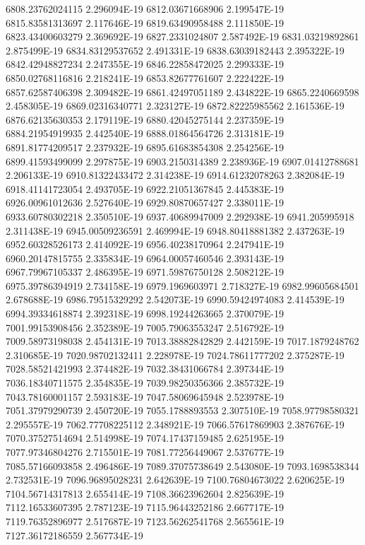 6808.23762024115  2.296094E-19
6812.03671668906  2.199547E-19
6815.83581313697  2.117646E-19
6819.63490958488  2.111850E-19
6823.43400603279  2.369692E-19
6827.2331024807  2.587492E-19
6831.03219892861  2.875499E-19
6834.83129537652  2.491331E-19
6838.63039182443  2.395322E-19
6842.42948827234  2.247355E-19
6846.22858472025  2.299333E-19
6850.02768116816  2.218241E-19
6853.82677761607  2.222422E-19
6857.62587406398  2.309482E-19
6861.42497051189  2.434822E-19
6865.2240669598  2.458305E-19
6869.02316340771  2.323127E-19
6872.82225985562  2.161536E-19
6876.62135630353  2.179119E-19
6880.42045275144  2.237359E-19
6884.21954919935  2.442540E-19
6888.01864564726  2.313181E-19
6891.81774209517  2.237932E-19
6895.61683854308  2.254256E-19
6899.41593499099  2.297875E-19
6903.2150314389  2.238936E-19
6907.01412788681  2.206133E-19
6910.81322433472  2.314238E-19
6914.61232078263  2.382084E-19
6918.41141723054  2.493705E-19
6922.21051367845  2.445383E-19
6926.00961012636  2.527640E-19
6929.80870657427  2.338011E-19
6933.60780302218  2.350510E-19
6937.40689947009  2.292938E-19
6941.205995918  2.311438E-19
6945.00509236591  2.469994E-19
6948.80418881382  2.437263E-19
6952.60328526173  2.414092E-19
6956.40238170964  2.247941E-19
6960.20147815755  2.335834E-19
6964.00057460546  2.393143E-19
6967.79967105337  2.486395E-19
6971.59876750128  2.508212E-19
6975.39786394919  2.734158E-19
6979.1969603971  2.718327E-19
6982.99605684501  2.678688E-19
6986.79515329292  2.542073E-19
6990.59424974083  2.414539E-19
6994.39334618874  2.392318E-19
6998.19244263665  2.370079E-19
7001.99153908456  2.352389E-19
7005.79063553247  2.516792E-19
7009.58973198038  2.454131E-19
7013.38882842829  2.442159E-19
7017.1879248762  2.310685E-19
7020.98702132411  2.228978E-19
7024.78611777202  2.375287E-19
7028.58521421993  2.374482E-19
7032.38431066784  2.397344E-19
7036.18340711575  2.354835E-19
7039.98250356366  2.385732E-19
7043.78160001157  2.593183E-19
7047.58069645948  2.523978E-19
7051.37979290739  2.450720E-19
7055.1788893553  2.307510E-19
7058.97798580321  2.295557E-19
7062.77708225112  2.348921E-19
7066.57617869903  2.387676E-19
7070.37527514694  2.514998E-19
7074.17437159485  2.625195E-19
7077.97346804276  2.715501E-19
7081.77256449067  2.537677E-19
7085.57166093858  2.496486E-19
7089.37075738649  2.543080E-19
7093.1698538344  2.732531E-19
7096.96895028231  2.642639E-19
7100.76804673022  2.620625E-19
7104.56714317813  2.655414E-19
7108.36623962604  2.825639E-19
7112.16533607395  2.787123E-19
7115.96443252186  2.667717E-19
7119.76352896977  2.517687E-19
7123.56262541768  2.565561E-19
7127.36172186559  2.567734E-19
